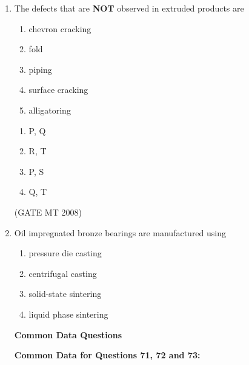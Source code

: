 \documentclass[11pt, letterpaper]{article}
\theoremstyle{remark}
\begin{document}
\begin{enumerate}[label=Q.\arabic*]
\item The defects that are \textbf{NOT} observed in extruded products are
       \begin{enumerate}[label=(\MakeUppercase{\alph*}), start=16]
            \item chevron cracking
            \item fold
            \item piping
            \item surface cracking
            \item alligatoring
        \end{enumerate}
        
    \begin{multicols}{2}
        \begin{enumerate}[label=(\MakeUppercase{\alph*})]
            \item P, Q
            \item R, T
            \item P, S
            \item Q, T
        \end{enumerate}
    \end{multicols}
\hfill(GATE MT 2008)
    \item Oil impregnated bronze bearings are manufactured using
    \begin{multicols}{2}
        \begin{enumerate}[label=(\MakeUppercase{\alph*})]
            \item pressure die casting
            \item centrifugal casting
            \item solid-state sintering
            \item liquid phase sintering
        \end{enumerate}
    \end{multicols}

    \vspace{0.5em}
    \textbf{Common Data Questions}

    \textbf{Common Data for Questions 71, 72 and 73:}


\end{enumerate}
\end{document}

